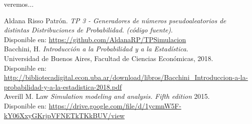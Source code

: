 \documentclass{article}
\begin{document}
veremos...





  
\begin{thebibliography}{2}

Aldana Risso Patrón. \textit{TP 3 - Generadores de números pseudoaleatorios de distintas Distribuciones de Probabilidad. (código fuente)}.\\
Disponible en: \url{https://github.com/AldanaRP/TPSimulacion} \\

Bacchini, H. \textit{Introducción a la Probabilidad y a la Estadística}.\\
Universidad de Buenos Aires, Facultad de Ciencias Económicas, 2018.\\
Disponible en: \url{http://bibliotecadigital.econ.uba.ar/download/libros/Bacchini_Introduccion-a-la-probabilidad-y-a-la-estadistica-2018.pdf}\\

Averill M. Law \textit{Simulation modeling and analysis. Fifth edition }2015. \\
Disponible en:
\url{https://drive.google.com/file/d/1ycmnW5F-kY06XxyGKrjpVFNETkTKkBUV/view}

\end{thebibliography}
\end{document}
